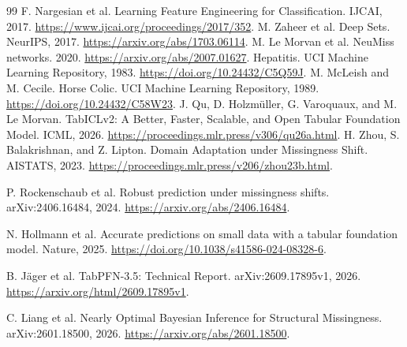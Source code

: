 \documentclass[10pt]{article}
\begin{document}
\begin{thebibliography}{99}
\small
{}
F. Nargesian et al. Learning Feature Engineering for Classification. IJCAI, 2017.
\url{https://www.ijcai.org/proceedings/2017/352}.
M. Zaheer et al. Deep Sets. NeurIPS, 2017.
\url{https://arxiv.org/abs/1703.06114}.
M. Le Morvan et al. NeuMiss networks. 2020.
\url{https://arxiv.org/abs/2007.01627}.
Hepatitis. UCI Machine Learning Repository, 1983.
\url{https://doi.org/10.24432/C5Q59J}.
M. McLeish and M. Cecile. Horse Colic. UCI Machine Learning Repository, 1989.
\url{https://doi.org/10.24432/C58W23}.
J. Qu, D. Holzm\"uller, G. Varoquaux, and M. Le Morvan.
TabICLv2: A Better, Faster, Scalable, and Open Tabular Foundation Model.
ICML, 2026.
\url{https://proceedings.mlr.press/v306/qu26a.html}.
H. Zhou, S. Balakrishnan, and Z. Lipton.
Domain Adaptation under Missingness Shift.
AISTATS, 2023.
\url{https://proceedings.mlr.press/v206/zhou23b.html}.

P. Rockenschaub et al.
Robust prediction under missingness shifts.
arXiv:2406.16484, 2024.
\url{https://arxiv.org/abs/2406.16484}.

N. Hollmann et al.
Accurate predictions on small data with a tabular foundation model.
Nature, 2025.
\url{https://doi.org/10.1038/s41586-024-08328-6}.

B. J\"ager et al.
TabPFN-3.5: Technical Report.
arXiv:2609.17895v1, 2026.
\url{https://arxiv.org/html/2609.17895v1}.

C. Liang et al.
Nearly Optimal Bayesian Inference for Structural Missingness.
arXiv:2601.18500, 2026.
\url{https://arxiv.org/abs/2601.18500}.


\end{thebibliography}
\end{document}
